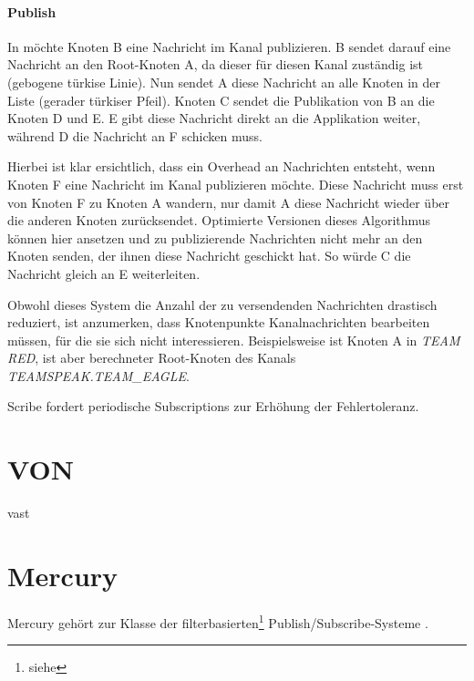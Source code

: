\paragraph*{Publish} In  möchte Knoten B eine Nachricht im Kanal publizieren. B sendet darauf eine Nachricht an den Root-Knoten A, da dieser für diesen Kanal zuständig ist (gebogene türkise Linie). Nun sendet A diese Nachricht an alle Knoten in der Liste (gerader türkiser Pfeil). Knoten C sendet die Publikation von B an die Knoten D und E. E gibt diese Nachricht direkt an die Applikation weiter, während D die Nachricht an F schicken muss.

Hierbei ist klar ersichtlich, dass ein Overhead an Nachrichten entsteht, wenn Knoten F eine Nachricht im Kanal publizieren möchte. Diese Nachricht muss erst von Knoten F zu Knoten A wandern, nur damit A diese Nachricht wieder über die anderen Knoten zurücksendet. Optimierte Versionen dieses Algorithmus können hier ansetzen und zu publizierende Nachrichten nicht mehr an den Knoten senden, der ihnen diese Nachricht geschickt hat. So würde C die Nachricht gleich an E weiterleiten.


Obwohl dieses System die Anzahl der zu versendenden Nachrichten drastisch reduziert, ist anzumerken, dass Knotenpunkte Kanalnachrichten bearbeiten müssen, für die sie sich nicht interessieren. Beispielsweise ist Knoten A in \emph{TEAM RED}, ist aber berechneter Root-Knoten des Kanals \emph{TEAMSPEAK.TEAM\_EAGLE}.

Scribe fordert periodische Subscriptions zur Erhöhung der Fehlertoleranz.

\section*{VON}
\label{chap:related:von}
\cite{Hu2006VON} %

\cite{Backhaus2007Voronoibased} %
\ac{vast}


\section*{Mercury}
\label{chap:related:mercury}
Mercury \cite{Bharambe2004Mercury} gehört zur Klasse der filterbasierten\footnote{siehe } Publish/Subscribe-Systeme .

